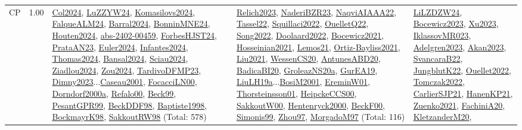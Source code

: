 {\begin{longtable}{p{3cm}r>{\raggedright\arraybackslash}p{6cm}>{\raggedright\arraybackslash}p{6cm}>{\raggedright\arraybackslash}p{8cm}}
\index{CP}\index{CP!CP}CP &  1.00 & \hyperref[detail:Col2024]{Col2024}, \hyperref[detail:LuZZYW24]{LuZZYW24}, \hyperref[detail:Komasilovs2024]{Komasilovs2024}, \hyperref[detail:FalqueALM24]{FalqueALM24}, \hyperref[detail:Barral2024]{Barral2024}, \hyperref[detail:BonninMNE24]{BonninMNE24}, \hyperref[detail:Houten2024]{Houten2024}, \hyperref[detail:abs-2402-00459]{abs-2402-00459}, \hyperref[detail:ForbesHJST24]{ForbesHJST24}, \hyperref[detail:PrataAN23]{PrataAN23}, \hyperref[detail:Euler2024]{Euler2024}, \hyperref[detail:Infantes2024]{Infantes2024}, \hyperref[detail:Thomas2024]{Thomas2024}, \hyperref[detail:Bansal2024]{Bansal2024}, \hyperref[detail:Sciau2024]{Sciau2024}, \hyperref[detail:Ziadlou2024]{Ziadlou2024}, \hyperref[detail:Zou2024]{Zou2024}, \hyperref[detail:TardivoDFMP23]{TardivoDFMP23}, \hyperref[detail:Dimny2023]{Dimny2023}...\hyperref[detail:Caseau2001]{Caseau2001}, \hyperref[detail:FocacciLN00]{FocacciLN00}, \hyperref[detail:Dorndorf2000a]{Dorndorf2000a}, \hyperref[detail:Refalo00]{Refalo00}, \hyperref[detail:Beck99]{Beck99}, \hyperref[detail:PesantGPR99]{PesantGPR99}, \hyperref[detail:BeckDDF98]{BeckDDF98}, \hyperref[detail:Baptiste1998]{Baptiste1998}, \hyperref[detail:BockmayrK98]{BockmayrK98}, \hyperref[detail:SakkoutRW98]{SakkoutRW98} (Total: 578) & \hyperref[detail:Relich2023]{Relich2023}, \hyperref[detail:NaderiBZR23]{NaderiBZR23}, \hyperref[detail:NaqviAIAAA22]{NaqviAIAAA22}, \hyperref[detail:Tassel22]{Tassel22}, \hyperref[detail:Squillaci2022]{Squillaci2022}, \hyperref[detail:OuelletQ22]{OuelletQ22}, \hyperref[detail:Song2022]{Song2022}, \hyperref[detail:Doolaard2022]{Doolaard2022}, \hyperref[detail:Bocewicz2021]{Bocewicz2021}, \hyperref[detail:Hosseinian2021]{Hosseinian2021}, \hyperref[detail:Lemos21]{Lemos21}, \hyperref[detail:Ortiz-Bayliss2021]{Ortiz-Bayliss2021}, \hyperref[detail:Liu2021]{Liu2021}, \hyperref[detail:WessenCS20]{WessenCS20}, \hyperref[detail:AntunesABD20]{AntunesABD20}, \hyperref[detail:BadicaBI20]{BadicaBI20}, \hyperref[detail:GroleazNS20a]{GroleazNS20a}, \hyperref[detail:GurEA19]{GurEA19}, \hyperref[detail:LiuLH19a]{LiuLH19a}...\hyperref[detail:BosiM2001]{BosiM2001}, \hyperref[detail:EreminW01]{EreminW01}, \hyperref[detail:Thorsteinsson01]{Thorsteinsson01}, \hyperref[detail:HeipckeCCS00]{HeipckeCCS00}, \hyperref[detail:SakkoutW00]{SakkoutW00}, \hyperref[detail:Hentenryck2000]{Hentenryck2000}, \hyperref[detail:BeckF00]{BeckF00}, \hyperref[detail:Simonis99]{Simonis99}, \hyperref[detail:Zhou97]{Zhou97}, \hyperref[detail:MorgadoM97]{MorgadoM97} (Total: 116) & \hyperref[detail:LiLZDZW24]{LiLZDZW24}, \hyperref[detail:Bocewicz2023]{Bocewicz2023}, \hyperref[detail:Xu2023]{Xu2023}, \hyperref[detail:IklassovMR023]{IklassovMR023}, \hyperref[detail:Adelgren2023]{Adelgren2023}, \hyperref[detail:Akan2023]{Akan2023}, \hyperref[detail:SvancaraB22]{SvancaraB22}, \hyperref[detail:JungblutK22]{JungblutK22}, \hyperref[detail:Ouellet2022]{Ouellet2022}, \hyperref[detail:Tomczak2022]{Tomczak2022}, \hyperref[detail:CarlierSJP21]{CarlierSJP21}, \hyperref[detail:HanenKP21]{HanenKP21}, \hyperref[detail:Zuenko2021]{Zuenko2021}, \hyperref[detail:FachiniA20]{FachiniA20}, \hyperref[detail:KletzanderM20]{KletzanderM20}, 
\end{longtable}}
